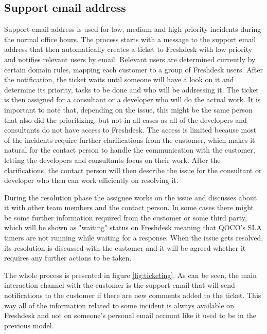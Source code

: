 \subsection{Support email address}

Support email address is used for low, medium and high priority incidents during the normal office hours. The process starts with a message to the support email address that
then automatically creates a ticket to Freshdesk with low priority and notifies relevant users by email. Relevant users are determined currently by certain domain rules,
mapping each customer to a group of Freshdesk users. After the notification, the ticket waits until someone will have a look on it and determine its priority, tasks to be done
and who will be addressing it. The ticket is then assigned for a consultant or a developer who will do the actual work. It is important to note that, depending on the issue,
this might be the same person that also did the prioritizing, but not in all cases as all of the developers and consultants do not have access to Freshdesk. The access is limited because
most of the incidents require further clarifications from the customer, which makes it natural for the contact person to handle the communication with the customer, letting the
developers and consultants focus on their work. After the clarifications, the contact person will then describe the issue for the consultant or developer who then can work
efficiently on resolving it.

During the resolution phase the assignee works on the issue and discusses about it with other team members and the contact person. In some cases there might be some further
information required from the customer or some third party, which will be shown as "waiting" status on Freshdesk meaning that QOCO's SLA timers are not running while waiting
for a response. When the issue gets resolved, its resolution is discussed with the customer and it will be agreed whether it requires any further actions to be taken. 

The whole process is presented in figure \ref{fig:ticketing}. As can be seen, the main interaction channel with the customer is the support email that will send notifications
to the customer if there are new comments added to the ticket. This way all of the information related to some incident is always
available on Freshdesk and not on someone's personal email account like it used to be in the previous model.


